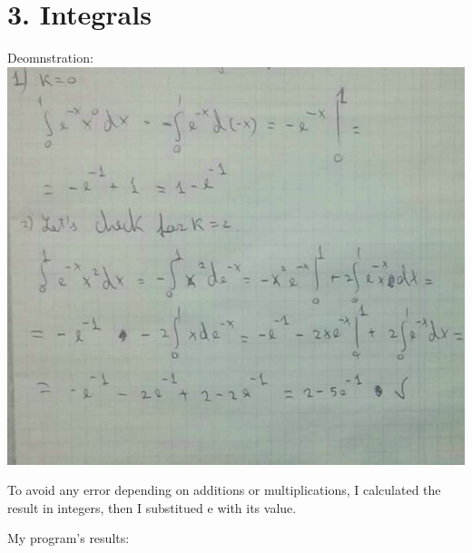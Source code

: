 \documentclass{article}
\begin{document}
    \newpage
    \section{3. Integrals}
    Deomnstration:
    \newline
\includegraphics[scale=0.6]{ex3_demonstration}
    \newline
	\par To avoid any error depending on additions or multiplications, I calculated
the result in integers, then I substitued e with its value.
        
My program's results:
\end{document}
